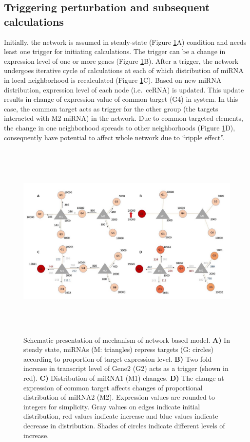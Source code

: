 \documentclass[a4,center,fleqn]{NAR}
\begin{document}
\subsection{Triggering perturbation and subsequent calculations}

Initially, the network is assumed in steady-state (Figure
\ref{fig:fig1}A) condition and needs least one trigger for initiating
calculations. The trigger can be a change in expression level of one or
more genes (Figure \ref{fig:fig1}B). After a trigger, the network
undergoes iterative cycle of calculations at each of which distribution
of miRNA in local neighborhood is recalculated (Figure \ref{fig:fig1}C).
Based on new miRNA distribution, expression level of each node
(i.e.~ceRNA) is updated. This update results in change of expression
value of common target (G4) in system. In this case, the common target
acts as trigger for the other group (the targets interacted with M2
miRNA) in the network. Due to common targeted elements, the change in
one neighborhood spreads to other neighborhoods (Figure
\ref{fig:fig1}D), consequently have potential to affect whole network
due to ``ripple effect''.

\begin{figure}[ht]
\begin{center}
\includegraphics[width=15cm,height=10cm]{Fig1.jpg}
\end{center}
\caption{Schematic presentation of mechanism of network based model. 
    \textbf{A)} In steady state, miRNAs (M: triangles) repress targets (G: circles) according to proportion of target expression level. 
    \textbf{B)} Two fold increase in transcript level of Gene2 (G2) acts as a trigger (shown in red). 
    \textbf{C)} Distribution of miRNA1 (M1) changes. 
    \textbf{D)} The change at expression of common target affects changes of proportional distribution of miRNA2 (M2). Expression values are rounded to integers for simplicity. Gray values on edges indicate initial distribution, red values indicate increase and blue values indicate decrease in distribution. Shades of circles indicate different levels of increase.}
\label{fig:fig1}
\end{figure}
\end{document}
